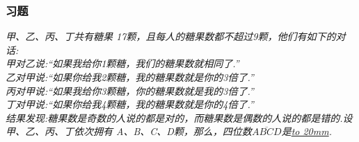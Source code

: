 
\begin{frame}
    \frametitle{习题\theframecounter}
    \vspace*{-1cm}
    \textit{甲、乙、丙、丁共有糖果 17颗，且每人的糖果数都不超过9颗，他们有如下的对话:\\
    甲对乙说:``如果我给你1颗糖，我们的糖果数就相同了.''\\
    乙对甲说:``如果你给我2颗糖，我的糖果数就是你的3倍了.''\\
    丙对甲说:``如果我给你3颗糖，你的糖果数就是我的3倍了.''\\
    丁对甲说:``如果你给我4颗糖，我的糖果数就是你的4倍了.''\\
    结果发现:糖果数是奇数的人说的都是对的，而糖果数是偶数的人说的都是错的.设甲、乙、丙、丁依次拥有 A、B、C、D颗，那么，四位数$\overline{ABCD}$是\underline{\hbox to 20mm{}}.}
\end{frame}